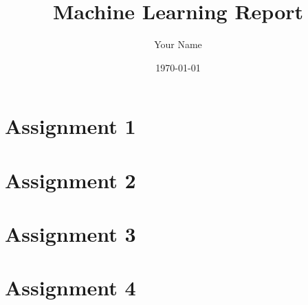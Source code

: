 \documentclass[12pt,a4paper]{report}
\title{Machine Learning Report}
\author{Your Name}
\date{\today}
\begin{document}
\maketitle
\tableofcontents

\chapter{Assignment 1}


\chapter{Assignment 2}


\chapter{Assignment 3}


\chapter{Assignment 4}




\end{document}
